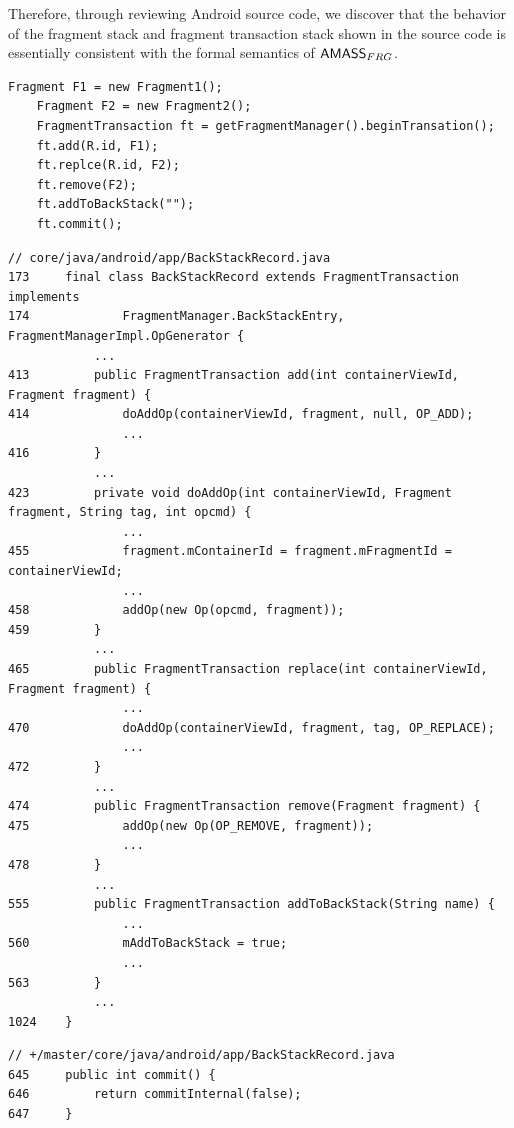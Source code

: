 {Therefore, through reviewing Android source code, we discover that the behavior of the fragment stack and fragment transaction stack shown in the source code is essentially consistent with the formal semantics of $\textsf{AMASS}_{FRG}$.

\begin{lstlisting}[caption={The sample code for FragmentTransaction},label={scode-fragtran}]
    Fragment F1 = new Fragment1();
    Fragment F2 = new Fragment2();
    FragmentTransaction ft = getFragmentManager().beginTransation();
    ft.add(R.id, F1);
    ft.replce(R.id, F2);
    ft.remove(F2);
    ft.addToBackStack("");
    ft.commit();
\end{lstlisting}
%
\begin{lstlisting}[caption={Android source code for responding add(), replace(), remove() and addToBackStack()},label={code-add}]
// core/java/android/app/BackStackRecord.java
173     final class BackStackRecord extends FragmentTransaction implements
174             FragmentManager.BackStackEntry, FragmentManagerImpl.OpGenerator {
            ...
413         public FragmentTransaction add(int containerViewId, Fragment fragment) {
414             doAddOp(containerViewId, fragment, null, OP_ADD);
                ...
416         }
            ...
423         private void doAddOp(int containerViewId, Fragment fragment, String tag, int opcmd) {
                ...
455             fragment.mContainerId = fragment.mFragmentId = containerViewId;
                ...
458             addOp(new Op(opcmd, fragment));
459         }
            ...
465         public FragmentTransaction replace(int containerViewId, Fragment fragment) {
                ...
470             doAddOp(containerViewId, fragment, tag, OP_REPLACE);
                ...
472         }
            ...
474         public FragmentTransaction remove(Fragment fragment) {
475             addOp(new Op(OP_REMOVE, fragment));
                ...
478         }
            ...
555         public FragmentTransaction addToBackStack(String name) {
                ...
560             mAddToBackStack = true;
                ...
563         }
            ...
1024    }
\end{lstlisting}

\begin{lstlisting}[caption={Android source code for responding commit() and popBackStack()},label={code-commit}]
// +/master/core/java/android/app/BackStackRecord.java
645     public int commit() {
646         return commitInternal(false);
647     }


\end{lstlisting}}
